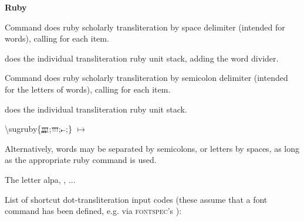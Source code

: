\documentclass{article}
\begin{document}
\bigskip\textbf{Ruby}

Command \cs{\sugrubyw} does ruby scholarly transliteration by space delimiter (intended for words), calling \cs{\smaprubyw} for each item.

\cs{\smaprubyw} does the individual transliteration ruby unit stack, adding the word divider.



\bigskip
Command \cs{\sugruby} does ruby scholarly transliteration by semicolon delimiter (intended for the letters of words), calling \cs{\smapruby} for each item.

\cs{\smapruby} does the individual transliteration ruby unit stack.

{\ttfamily\color{blue}\textbackslash sugruby\{{\ugfont\scriptsize 𐎄};{\ugfont\scriptsize 𐎍};{\ugfont\scriptsize 𐎚};\}}
\enspace$\mapsto$\enspace
{}



Alternatively, words may be separated by semicolons, or letters by spaces, as long as the appropriate ruby command is used.

\bigskip
The letter alpa, , ...

\bigskip
List of shortcut dot-transliteration input codes (these assume that a font command \cs{\ugfont} has been defined, e.g. via \textsc{fontspec}'s ):
\end{document}

